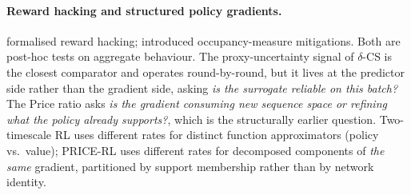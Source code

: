 \paragraph{Reward hacking and structured policy gradients.} \citet{skalse2022defining} formalised reward hacking; \citet{laidlaw2025correlated} introduced occupancy-measure mitigations. Both are post-hoc tests on aggregate behaviour. The proxy-uncertainty signal of $\delta$-CS \citep{kim2025deltacs} is the closest comparator and operates round-by-round, but it lives at the predictor side rather than the gradient side, asking \emph{is the surrogate reliable on this batch?} The Price ratio asks \emph{is the gradient consuming new sequence space or refining what the policy already supports?}, which is the structurally earlier question. Two-timescale RL \citep{konda2000actor,karimi2022two} uses different rates for distinct function approximators (policy vs.\ value); PRICE-RL uses different rates for decomposed components of \emph{the same} gradient, partitioned by support membership rather than by network identity.

